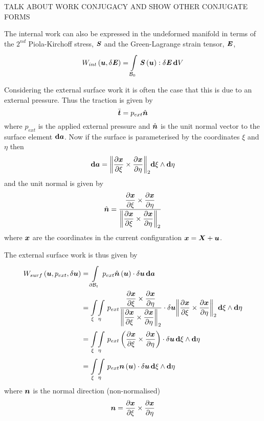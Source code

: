 TALK ABOUT WORK CONJUGACY AND SHOW OTHER CONJUGATE FORMS

The internal work can also be expressed in the undeformed manifold in terms of
the $2^{nd}$ Piola-Kirchoff stress, $\boldsymbol{\mathit{S}}$ and the Green-Lagrange strain
tensor, $\boldsymbol{\mathit{E}}$, \ie
\begin{equation}
   W_{int}\left( \boldsymbol{u},\delta\boldsymbol{\mathit{E}} \right) =  \displaystyle\int\limits_{ \mathcal{B} _{0}}^{} \,
       \boldsymbol{\mathit{S}}\left( \boldsymbol{u} \right) :\delta\boldsymbol{\mathit{E}}\, \boldsymbol{\mathrm{d}}  V 
\end{equation}

Considering the external surface work it is often the case that this is due to
an external pressure. Thus the traction is given by
\begin{equation}
  \bar{\boldsymbol{t}}=p_{ext}\hat{\boldsymbol{n}}
\end{equation}
where $p_{ext}$ is the applied external pressure and $\hat{\boldsymbol{n}}$ is the
unit normal vector to the surface element $  \boldsymbol{\mathrm{d}} \boldsymbol{a} $. Now
if the surface is parameterised by the coordinates $\xi$ and $\eta$ then
\begin{equation}
    \boldsymbol{\mathrm{d}} \boldsymbol{a} =
   {\left\|  \dfrac{\partial \boldsymbol{x}}{\partial \xi} \times \dfrac{\partial \boldsymbol{x}}{\partial \eta}  \right\|_{2}} 
     \boldsymbol{\mathrm{d}} \xi  \wedge   \boldsymbol{\mathrm{d}} \eta  
\end{equation}
and the unit normal is given by
\begin{equation}
  \hat{\boldsymbol{n}}=\dfrac{ \dfrac{\partial \boldsymbol{x}}{\partial \xi} \times \dfrac{\partial \boldsymbol{x}}{\partial \eta} }{
     {\left\|  \dfrac{\partial \boldsymbol{x}}{\partial \xi} \times \dfrac{\partial \boldsymbol{x}}{\partial \eta}  \right\|_{2}} }
\end{equation}
where $\boldsymbol{x}$ are the coordinates in the current configuration \ie $\boldsymbol{x}=\boldsymbol{X}+\boldsymbol{u}$.

The external surface work is thus given by
\begin{equation}
  \begin{split}
     W_{surf}\left( \boldsymbol{u},p_{ext},\delta\boldsymbol{u} \right) &=
      \displaystyle\int\limits_{ \partial{\ensuremath{ \mathcal{B} }} _{t}}^{} \,p_{ext} \hat{\boldsymbol{n}}\left( \boldsymbol{u} \right) \cdot
        \delta\boldsymbol{u}\, \boldsymbol{\mathrm{d}} \boldsymbol{a} \\
    &=  \displaystyle\int\limits_{\xi}^{} \! \displaystyle\int\limits_{\eta}^{} \,p_{ext}\dfrac{ \dfrac{\partial \boldsymbol{x}}{\partial \xi} \times \dfrac{\partial \boldsymbol{x}}{\partial \eta} }{ {\left\|  \dfrac{\partial \boldsymbol{x}}{\partial \xi} \times \dfrac{\partial \boldsymbol{x}}{\partial \eta}  \right\|_{2}} }\cdot\delta\boldsymbol{u} {\left\|  \dfrac{\partial \boldsymbol{x}}{\partial \xi} \times \dfrac{\partial \boldsymbol{x}}{\partial \eta}  \right\|_{2}} \, \boldsymbol{\mathrm{d}} \xi\wedge \boldsymbol{\mathrm{d}} \eta  \\
    &=  \displaystyle\int\limits_{\xi}^{} \! \displaystyle\int\limits_{\eta}^{} \,p_{ext}\left(  \dfrac{\partial \boldsymbol{x}}{\partial \xi} \times \dfrac{\partial \boldsymbol{x}}{\partial \eta}  \right)\cdot\delta\boldsymbol{u}\, \boldsymbol{\mathrm{d}} \xi\wedge \boldsymbol{\mathrm{d}} \eta \\
    &=  \displaystyle\int\limits_{\xi}^{} \! \displaystyle\int\limits_{\eta}^{} \,p_{ext} \boldsymbol{n}\left( \boldsymbol{u} \right) \cdot\delta\boldsymbol{u}\, \boldsymbol{\mathrm{d}} \xi\wedge \boldsymbol{\mathrm{d}} \eta 
  \end{split}
\end{equation}
where $\boldsymbol{n}$ is the normal direction (non-normalised) \ie
\begin{equation}
  \boldsymbol{n}= \dfrac{\partial \boldsymbol{x}}{\partial \xi} \times \dfrac{\partial \boldsymbol{x}}{\partial \eta} 
\end{equation}
 
